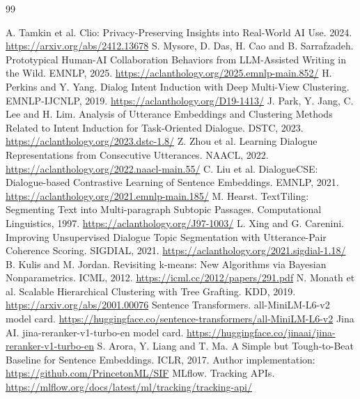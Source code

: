 \documentclass[11pt]{article}
\begin{document}
\begin{thebibliography}{99}
\raggedright
{} A. Tamkin et al. Clio: Privacy-Preserving Insights into
Real-World AI Use. 2024. \url{https://arxiv.org/abs/2412.13678}
 S. Mysore, D. Das, H. Cao and B. Sarrafzadeh.
Prototypical Human-AI Collaboration Behaviors from LLM-Assisted Writing in
the Wild. EMNLP, 2025. \url{https://aclanthology.org/2025.emnlp-main.852/}
 H. Perkins and Y. Yang. Dialog Intent Induction with
Deep Multi-View Clustering. EMNLP-IJCNLP, 2019.
\url{https://aclanthology.org/D19-1413/}
 J. Park, Y. Jang, C. Lee and H. Lim.
Analysis of Utterance Embeddings and Clustering Methods Related to Intent
Induction for Task-Oriented Dialogue. DSTC, 2023.
\url{https://aclanthology.org/2023.dstc-1.8/}
 Z. Zhou et al. Learning Dialogue Representations from
Consecutive Utterances. NAACL, 2022.
\url{https://aclanthology.org/2022.naacl-main.55/}
 C. Liu et al. DialogueCSE: Dialogue-based Contrastive
Learning of Sentence Embeddings. EMNLP, 2021.
\url{https://aclanthology.org/2021.emnlp-main.185/}
 M. Hearst. TextTiling: Segmenting Text into Multi-paragraph
Subtopic Passages. Computational Linguistics, 1997.
\url{https://aclanthology.org/J97-1003/}
 L. Xing and G. Carenini. Improving Unsupervised Dialogue Topic
Segmentation with Utterance-Pair Coherence Scoring. SIGDIAL, 2021.
\url{https://aclanthology.org/2021.sigdial-1.18/}
 B. Kulis and M. Jordan. Revisiting k-means: New Algorithms
via Bayesian Nonparametrics. ICML, 2012.
\url{https://icml.cc/2012/papers/291.pdf}
 N. Monath et al. Scalable Hierarchical Clustering with Tree
Grafting. KDD, 2019. \url{https://arxiv.org/abs/2001.00076}
 Sentence Transformers. all-MiniLM-L6-v2 model card.
\url{https://huggingface.co/sentence-transformers/all-MiniLM-L6-v2}
 Jina AI. jina-reranker-v1-turbo-en model card.
\url{https://huggingface.co/jinaai/jina-reranker-v1-turbo-en}
 S. Arora, Y. Liang and T. Ma.
A Simple but Tough-to-Beat Baseline for Sentence Embeddings. ICLR, 2017.
Author implementation: \url{https://github.com/PrincetonML/SIF}
 MLflow. Tracking APIs.
\url{https://mlflow.org/docs/latest/ml/tracking/tracking-api/}
\end{thebibliography}
\end{document}
